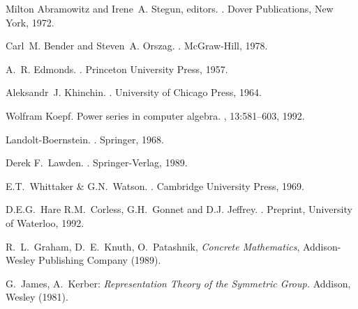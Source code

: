 \begin{thebibliography}{999}

Milton Abramowitz and Irene~A. Stegun, editors.
.
\newblock Dover Publications, New York, 1972.

Carl~M. Bender and Steven~A. Orszag.
.
\newblock McGraw-Hill, 1978.

A.~R. Edmonds.
.
\newblock Princeton University Press, 1957.


Aleksandr~J. Khinchin.
.
\newblock University of Chicago Press, 1964.

Wolfram Koepf.
\newblock Power series in computer algebra.
, 13:581--603, 1992.

Landolt-Boernstein.
.
\newblock Springer, 1968.

Derek F.~Lawden.
.
\newblock Springer-Verlag, 1989.

E.T.~Whittaker \& G.N.~Watson.
.
\newblock Cambridge University Press, 1969.

D.E.G.~Hare R.M.~Corless, G.H.~Gonnet and D.J. Jeffrey.
.
\newblock Preprint, University of Waterloo, 1992.



 R.~L.~Graham, D.~E.~Knuth, O.~Patashnik,
{\em Concrete Mathematics}, Addison-Wesley Publishing Company (1989).


 G.\ James, A.\ Kerber: {\it Representation Theory
of the Symmetric Group.} Addison, Wesley (1981).


\end{thebibliography}
